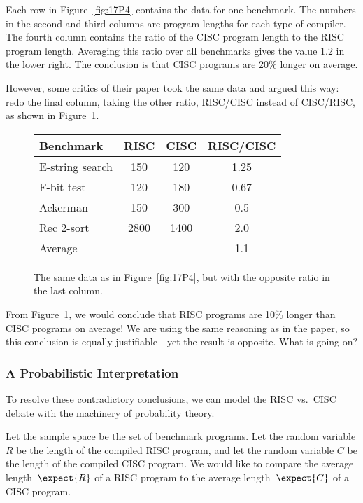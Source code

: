 Each row in Figure~\ref{fig:17P4} contains the data for one benchmark.
The numbers in the second and third columns are program lengths for
each type of compiler.  The fourth column contains the ratio of the
CISC program length to the RISC program length.  Averaging this ratio
over all benchmarks gives the value 1.2 in the lower right.  The
conclusion is that CISC programs are 20\% longer on average.

However, some critics of their paper took the same data and argued this
way: redo the final column, taking the other ratio, RISC/CISC instead of
CISC/RISC, as shown in Figure~\ref{fig:17P5}.

\begin{figure}

\begin{tabular}{lccc}
Benchmark        & RISC          & CISC          & RISC/CISC\\
\hline
E-string search  & 150           & 120           & 1.25 \\
F-bit test       & 120           & 180           & 0.67 \\
Ackerman         & 150           & 300           & 0.5 \\
Rec 2-sort       & 2800          & 1400          & 2.0 \\
\hline
Average          &               &               & 1.1
\end{tabular}

\caption{The same data as in Figure~\ref{fig:17P4}, but with the
  opposite ratio in the last column.}

\label{fig:17P5}

\end{figure}

From Figure~\ref{fig:17P5}, we would conclude that RISC programs are
10\% longer than CISC programs on average!  We are using the same
reasoning as in the paper, so this conclusion is equally
justifiable---yet the result is opposite.  What is going on?

\subsubsection{A Probabilistic Interpretation}

To resolve these contradictory conclusions, we can model the RISC
vs.\ CISC debate with the machinery of probability theory.

Let the sample space be the set of benchmark programs.  Let the random
variable $R$ be the length of the compiled RISC program, and let the
random variable $C$ be the length of the compiled CISC program.  We would
like to compare the average length~$\expect{R}$ of a RISC program to the
average length~$\expect{C}$ of a CISC program.

